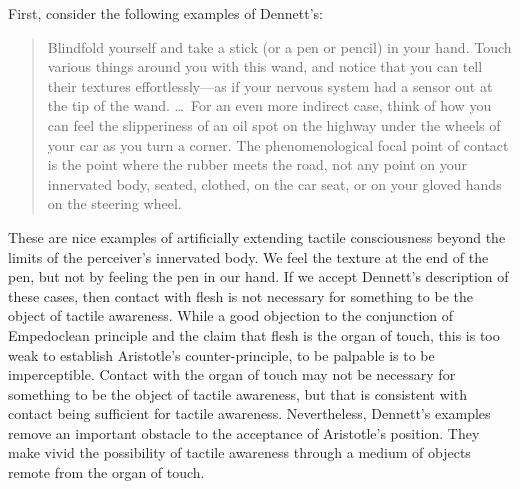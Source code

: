First, consider the following examples of Dennett's:
\begin{quote}
    Blindfold yourself and take a stick (or a pen or pencil) in your hand. Touch various things around you with this wand, and notice that you can tell their textures effortlessly---as if your nervous system had a sensor out at the tip of the wand. \ldots\ For an even more indirect case, think of how you can feel the slipperiness of an oil spot on the highway under the wheels of your car as you turn a corner. The phenomenological focal point of contact is the point where the rubber meets the road, not any point on your innervated body, seated, clothed, on the car seat, or on your gloved hands on the steering wheel. \citep[47]{Dennett:1993ce}
\end{quote}
These are nice examples of artificially extending tactile consciousness beyond the limits of the perceiver's innervated body. We feel the texture at the end of the pen, but not by feeling the pen in our hand. If we accept Dennett's description of these cases, then contact with flesh is not necessary for something to be the object of tactile awareness. While a good objection to the conjunction of Empedoclean principle and the claim that flesh is the organ of touch, this is too weak to establish Aristotle's counter-principle, to be palpable is to be imperceptible. Contact with the organ of touch may not be necessary for something to be the object of tactile awareness, but that is consistent with contact being sufficient for tactile awareness. Nevertheless, Dennett's examples remove an important obstacle to the acceptance of Aristotle's position. They make vivid the possibility of tactile awareness through a medium of objects remote from the organ of touch.

